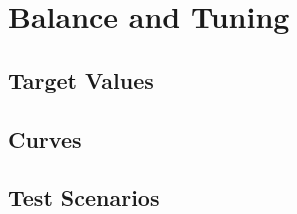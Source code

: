 \section{Balance and Tuning}

\subsection{Target Values}

\subsection{Curves}

\subsection{Test Scenarios}



